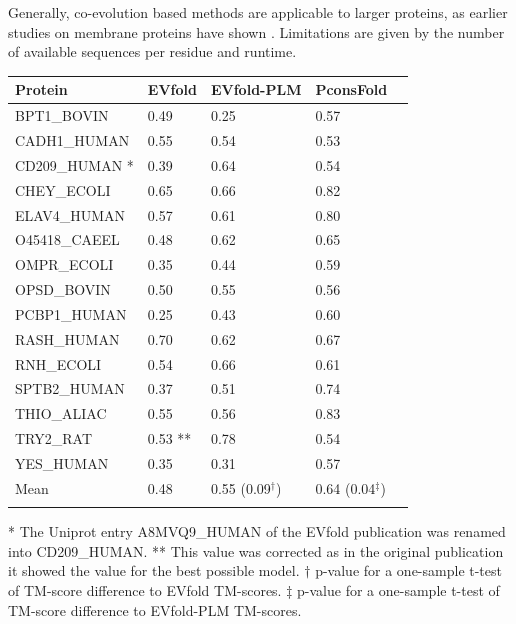 \documentclass{bioinfo}
\begin{document}
{\color{red}Generally, co-evolution based methods are applicable to larger proteins, as
earlier studies on membrane proteins have shown
\cite[]{hopf_three-dimensional_2012, nugent_accurate_2012}. Limitations
are given by the number of available sequences per residue
\cite[]{hopf_three-dimensional_2012, kamisetty_assessing_2013} and runtime.}

\begin{table}[!t]
{\begin{tabular}{lp{1.5cm}p{1.5cm}p{1.5cm}p{1.5cm}}\toprule
Protein & EVfold  & EVfold-PLM  & PconsFold\\\midrule
BPT1\_BOVIN & 0.49 & 0.25  & 0.57 \\
CADH1\_HUMAN & 0.55 & 0.54  & 0.53 \\
CD209\_HUMAN * & 0.39 & 0.64  & 0.54 \\
CHEY\_ECOLI & 0.65 & 0.66  & 0.82 \\
ELAV4\_HUMAN & 0.57 & 0.61  & 0.80 \\
O45418\_CAEEL & 0.48 & 0.62  & 0.65 \\
OMPR\_ECOLI & 0.35 & 0.44  & 0.59 \\
OPSD\_BOVIN & 0.50 & 0.55  & 0.56 \\
PCBP1\_HUMAN & 0.25 & 0.43  & 0.60 \\
RASH\_HUMAN & 0.70 & 0.62  & 0.67 \\
RNH\_ECOLI & 0.54 & 0.66  & 0.61 \\
SPTB2\_HUMAN & 0.37 & 0.51 & 0.74 \\
THIO\_ALIAC & 0.55 & 0.56  & 0.83 \\
TRY2\_RAT & 0.53 ** & 0.78  & 0.54 \\
YES\_HUMAN & 0.35 & 0.31  & 0.57 \\ \midrule
Mean & 0.48 & 0.55 {\color{red}(0.09$^\dagger$)} & 0.64 {\color{red}(0.04$^\ddagger$)} \\ \botrule
\end{tabular}}{* The Uniprot entry A8MVQ9\_HUMAN of the EVfold
publication was renamed into CD209\_HUMAN. ** This value was corrected
as in the original publication it showed the value for the best
possible model. {\color{red} $\dagger$ p-value for a one-sample t-test of TM-score
difference to EVfold TM-scores. $\ddagger$ p-value for a one-sample t-test of
TM-score difference to EVfold-PLM TM-scores.}}
\end{table}
\end{document}
